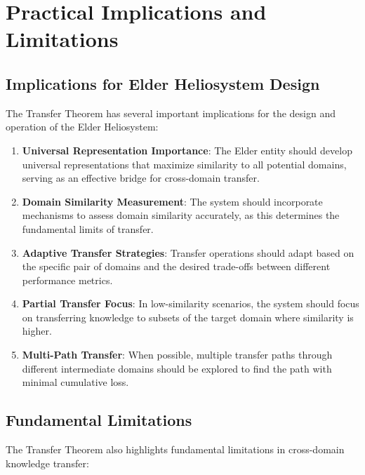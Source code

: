 \section{Practical Implications and Limitations}

\subsection{Implications for Elder Heliosystem Design}

The Transfer Theorem has several important implications for the design and operation of the Elder Heliosystem:

\begin{enumerate}
    \item \textbf{Universal Representation Importance}: The Elder entity should develop universal representations that maximize similarity to all potential domains, serving as an effective bridge for cross-domain transfer.
    
    \item \textbf{Domain Similarity Measurement}: The system should incorporate mechanisms to assess domain similarity accurately, as this determines the fundamental limits of transfer.
    
    \item \textbf{Adaptive Transfer Strategies}: Transfer operations should adapt based on the specific pair of domains and the desired trade-offs between different performance metrics.
    
    \item \textbf{Partial Transfer Focus}: In low-similarity scenarios, the system should focus on transferring knowledge to subsets of the target domain where similarity is higher.
    
    \item \textbf{Multi-Path Transfer}: When possible, multiple transfer paths through different intermediate domains should be explored to find the path with minimal cumulative loss.
\end{enumerate}

\subsection{Fundamental Limitations}

The Transfer Theorem also highlights fundamental limitations in cross-domain knowledge transfer:

